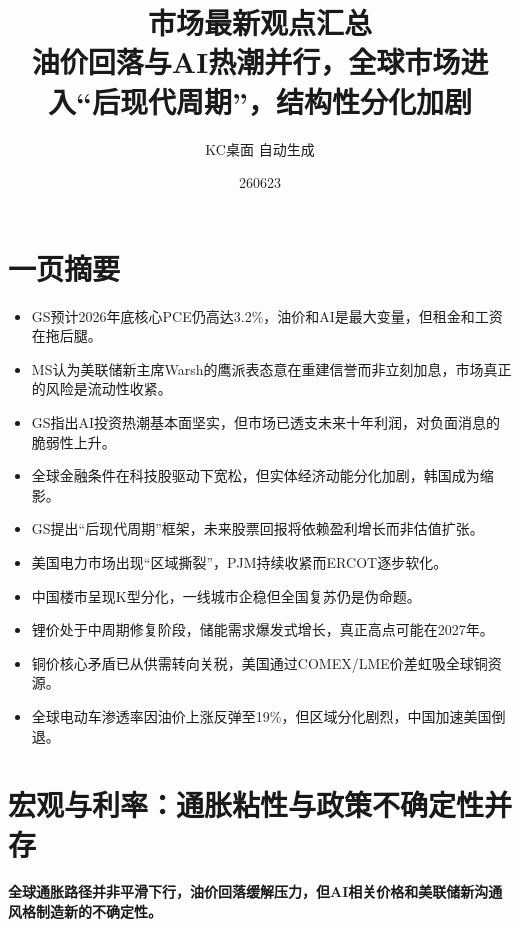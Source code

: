 \documentclass[11pt]{ctexart}
\title{\textbf{市场最新观点汇总}\\[0.4em]{\large 油价回落与AI热潮并行，全球市场进入“后现代周期”，结构性分化加剧}}
\author{KC桌面 自动生成}
\date{260623}
\begin{document}
\maketitle
\tableofcontents
\newpage
\section{一页摘要}
\begin{itemize}
  \item GS预计2026年底核心PCE仍高达3.2\%，油价和AI是最大变量，但租金和工资在拖后腿。
  \item MS认为美联储新主席Warsh的鹰派表态意在重建信誉而非立刻加息，市场真正的风险是流动性收紧。
  \item GS指出AI投资热潮基本面坚实，但市场已透支未来十年利润，对负面消息的脆弱性上升。
  \item 全球金融条件在科技股驱动下宽松，但实体经济动能分化加剧，韩国成为缩影。
  \item GS提出“后现代周期”框架，未来股票回报将依赖盈利增长而非估值扩张。
  \item 美国电力市场出现“区域撕裂”，PJM持续收紧而ERCOT逐步软化。
  \item 中国楼市呈现K型分化，一线城市企稳但全国复苏仍是伪命题。
  \item 锂价处于中周期修复阶段，储能需求爆发式增长，真正高点可能在2027年。
  \item 铜价核心矛盾已从供需转向关税，美国通过COMEX/LME价差虹吸全球铜资源。
  \item 全球电动车渗透率因油价上涨反弹至19\%，但区域分化剧烈，中国加速美国倒退。
\end{itemize}
\section{宏观与利率：通胀粘性与政策不确定性并存}
\textbf{全球通胀路径并非平滑下行，油价回落缓解压力，但AI相关价格和美联储新沟通风格制造新的不确定性。}
\end{document}
